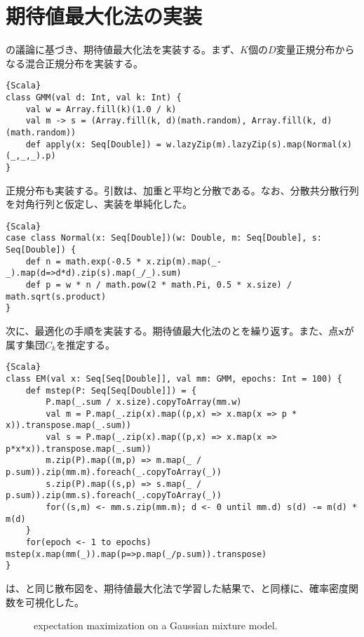 \documentclass[10pt,a4paper]{book}
\begin{document}
\section{期待値最大化法の実装}

の議論に基づき、期待値最大化法を実装する。まず、$K$個の$D$変量正規分布からなる混合正規分布を実装する。

\begin{Verbatim}{Scala}
class GMM(val d: Int, val k: Int) {
	val w = Array.fill(k)(1.0 / k)
	val m -> s = (Array.fill(k, d)(math.random), Array.fill(k, d)(math.random))
	def apply(x: Seq[Double]) = w.lazyZip(m).lazyZip(s).map(Normal(x)(_,_,_).p)
}
\end{Verbatim}

正規分布も実装する。引数は、加重と平均と分散である。なお、分散共分散行列を対角行列と仮定し、実装を単純化した。

\begin{Verbatim}{Scala}
case class Normal(x: Seq[Double])(w: Double, m: Seq[Double], s: Seq[Double]) {
	def n = math.exp(-0.5 * x.zip(m).map(_-_).map(d=>d*d).zip(s).map(_/_).sum)
	def p = w * n / math.pow(2 * math.Pi, 0.5 * x.size) / math.sqrt(s.product)
}
\end{Verbatim}

次に、最適化の手順を実装する。期待値最大化法の\Estep{}と\Mstep{}を繰り返す。また、点$\bm{x}$が属す集団$C_k$を推定する。

\begin{Verbatim}{Scala}
class EM(val x: Seq[Seq[Double]], val mm: GMM, epochs: Int = 100) {
	def mstep(P: Seq[Seq[Double]]) = {
		P.map(_.sum / x.size).copyToArray(mm.w)
		val m = P.map(_.zip(x).map((p,x) => x.map(x => p * x)).transpose.map(_.sum))
		val s = P.map(_.zip(x).map((p,x) => x.map(x => p*x*x)).transpose.map(_.sum))
		m.zip(P).map((m,p) => m.map(_ / p.sum)).zip(mm.m).foreach(_.copyToArray(_))
		s.zip(P).map((s,p) => s.map(_ / p.sum)).zip(mm.s).foreach(_.copyToArray(_))
		for((s,m) <- mm.s.zip(mm.m); d <- 0 until mm.d) s(d) -= m(d) * m(d)
	}
	for(epoch <- 1 to epochs) mstep(x.map(mm(_)).map(p=>p.map(_/p.sum)).transpose)
}
\end{Verbatim}

は、と同じ散布図を、期待値最大化法で学習した結果で、と同様に、確率密度関数を可視化した。

\begin{figure}[h]
\centering
{}
\caption{expectation maximization on a Gaussian mixture model.\label{fig:em}}
\end{figure}
\end{document}
